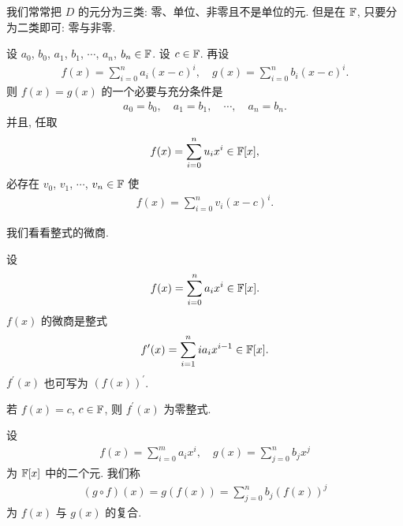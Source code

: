 \begin{remark}
    我们常常把 $D$ 的元分为三类: 零、单位、非零且不是单位的元. 但是在 $\mathbb{F}$, 只要分为二类即可: 零与非零.
\end{remark}

\begin{proposition}
    设 $a_0$, $b_0$, $a_1$, $b_1$, $\cdots$, $a_n$, $b_n \in \mathbb{F}$. 设 $c \in \mathbb{F}$. 再设
    \begin{align*}
        f(x) = \sum_{i = 0}^n a_i (x-c)^i, \quad g(x) = \sum_{i = 0}^n b_i (x-c)^i.
    \end{align*}
    则 $f(x)=g(x)$ 的一个必要与充分条件是
    \begin{align*}
        a_0 = b_0, \quad a_1 = b_1, \quad \cdots, \quad a_n = b_n.
    \end{align*}
    并且, 任取
    \begin{align*}
        f(x) = \sum_{i = 0}^n u_i x^i \in \mathbb{F}[x],
    \end{align*}
    必存在 $v_0$, $v_1$, $\cdots$, $v_n \in \mathbb{F}$ 使
    \begin{align*}
        f(x) = \sum_{i = 0}^n v_i (x-c)^i.
    \end{align*}
\end{proposition}

我们看看整式的微商.

\begin{definition}
    设
    \begin{align*}
        f(x) = \sum_{i = 0}^{n} a_i x^i \in \mathbb{F}[x].
    \end{align*}
    $f(x)$ 的微商是整式
    \begin{align*}
        f^{\prime}(x) = \sum_{i = 1}^{n} i a_i x^{i - 1} \in \mathbb{F}[x].
    \end{align*}
    $f^{\prime} (x)$ 也可写为 $(f(x))^{\prime}$.
\end{definition}

\begin{remark}
    若 $f(x) = c$, $c \in \mathbb{F}$, 则 $f^{\prime} (x)$ 为零整式.
\end{remark}

\begin{definition}
    设
    \begin{align*}
        f(x) = \sum_{i = 0}^{m} a_i x^i, \quad g(x) = \sum_{j = 0}^{n} b_j x^j
    \end{align*}
    为 $\mathbb{F}[x]$ 中的二个元. 我们称
    \begin{align*}
        (g \circ f)(x) = g(f(x)) = \sum_{j = 0}^{n} b_j (f(x))^j
    \end{align*}
    为 $f(x)$ 与 $g(x)$ 的复合.
\end{definition}

